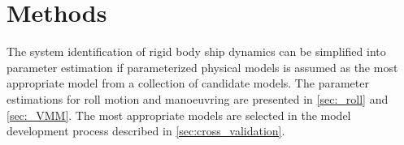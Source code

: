 \chapter{Methods\label{ch:methods}}
The system identification of rigid body ship dynamics can be simplified into parameter estimation if parameterized physical models is assumed as the most appropriate model from a collection of candidate models.
The parameter estimations for roll motion and manoeuvring are presented in \autoref{sec:_roll} and \autoref{sec:_VMM}. The most appropriate models are selected in the model development process described in \autoref{sec:cross_validation}.






%
%






